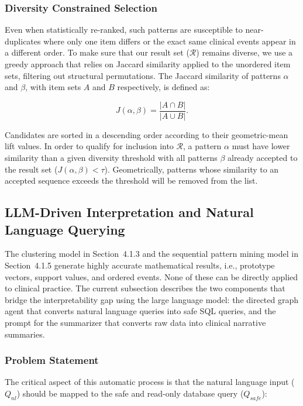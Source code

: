 \subsubsection*{Diversity Constrained Selection}

Even when statistically re-ranked, such patterns are susceptible to near-duplicates where only one item differs or the exact same clinical events appear in a different order. To make sure that our result set ($\mathcal{R}$) remains diverse, we use a greedy approach that relies on Jaccard similarity applied to the unordered item sets, filtering out structural permutations. The Jaccard similarity of patterns $\alpha$ and $\beta$, with item sets $A$ and $B$ respectively, is defined as:

\begin{equation}
    J(\alpha, \beta) = \frac{|A \cap B|}{|A \cup B|}.
    \label{eq:jaccard}
\end{equation}

Candidates are sorted in a descending order according to their geometric-mean lift values. In order to qualify for inclusion into $\mathcal{R}$, a pattern $\alpha$ must have lower similarity than a given diversity threshold with all patterns $\beta$ already accepted to the result set ($J(\alpha, \beta) < \tau$). Geometrically, patterns whose similarity to an accepted sequence exceeds the threshold will be removed from the list.
\subsection{LLM-Driven Interpretation and Natural Language Querying}

The clustering model in Section~4.1.3 and the sequential pattern mining model in Section~4.1.5 generate highly accurate mathematical results, i.e., prototype vectors, support values, and ordered events. None of these can be directly applied to clinical practice. The current subsection describes the two components that bridge the interpretability gap using the large language model: the directed graph agent that converts natural language queries into safe SQL queries, and the prompt for the summarizer that converts raw data into clinical narrative summaries.

\subsubsection*{Problem Statement}

The critical aspect of this automatic process is that the natural language input ($Q_{nl}$) should be mapped to the safe and read-only database query ($Q_{safe}$):

